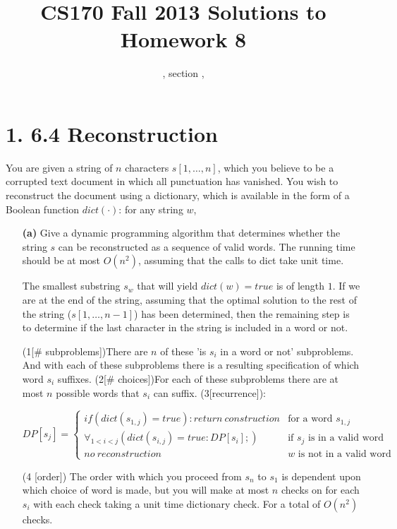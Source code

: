 \documentclass[11pt]{article}
\title{CS170  Fall 2013 Solutions to Homework 8}
\author{\Name, section \Sec, \texttt{\Login}}
\begin{document}
\maketitle

\section*{1. 6.4 Reconstruction}

You are given a string of $n$ characters $s[1,\ldots,n]$, which you believe to be a corrupted text document
in which all punctuation has vanished. You wish to reconstruct the document using a dictionary, 
which is available in the form of a Boolean function $dict(\cdot)$: for any string $w$,
%
%
\begin{itemize}

\item[{\bf (a)}] Give a dynamic programming algorithm that determines whether the string $s$ can be reconstructed as a sequence of valid words.
The running time should be at most $O(n^2)$, assuming that the calls to dict take unit time.

The smallest substring $s_w$ that will yield $dict(w) = true$ is of length $1$.
If we are at the end of the string, assuming that the optimal solution to the rest of the string ($s[1,\ldots,n-1]$) 
has been determined, then the remaining step is to determine if the last character in the string is included in a word or not. 

(1[\# subproblems])There are $n$ of these 'is $s_i$ in a word or not' subproblems. And with each of these subproblems there is
a resulting specification of which word $s_i$ suffixes.
(2[\# choices])For each of these subproblems there are at most $n$ possible words that $s_i$ can suffix.
(3[recurrence]):

\begin{displaymath}
   DP[s_{j}] = \left\{
     \begin{array}{lr}
       if (dict(s_{1,j})=true): return\: construction& \mbox{for a word $s_{1,j}$}\\
       \forall_{1 < i < j}(dict(s_{i,j})=true: DP[s_{i}];) &\mbox{if $s_j$ is in a valid word}\\
       no\: reconstruction & \mbox{$w$ is not in a valid word}
     \end{array}
   \right.
\end{displaymath}   

(4 [order]) The order with which you proceed from $s_n$ to $s_1$ is dependent upon which choice of word is made, but you will make
at most $n$ checks on for each $s_i$ with each check taking a unit time dictionary check. For a total of $O(n^2)$ checks.

\end{itemize}
\end{document}
